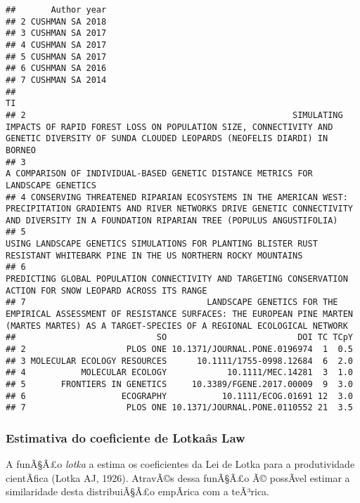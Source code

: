 \documentclass[]{article}
\begin{document}
\begin{verbatim}
##       Author year
## 2 CUSHMAN SA 2018
## 3 CUSHMAN SA 2017
## 4 CUSHMAN SA 2017
## 5 CUSHMAN SA 2017
## 6 CUSHMAN SA 2016
## 7 CUSHMAN SA 2014
##                                                                                                                                                                                                         TI
## 2                                                     SIMULATING IMPACTS OF RAPID FOREST LOSS ON POPULATION SIZE, CONNECTIVITY AND GENETIC DIVERSITY OF SUNDA CLOUDED LEOPARDS (NEOFELIS DIARDI) IN BORNEO
## 3                                                                                                                         A COMPARISON OF INDIVIDUAL-BASED GENETIC DISTANCE METRICS FOR LANDSCAPE GENETICS
## 4 CONSERVING THREATENED RIPARIAN ECOSYSTEMS IN THE AMERICAN WEST: PRECIPITATION GRADIENTS AND RIVER NETWORKS DRIVE GENETIC CONNECTIVITY AND DIVERSITY IN A FOUNDATION RIPARIAN TREE (POPULUS ANGUSTIFOLIA)
## 5                                                                               USING LANDSCAPE GENETICS SIMULATIONS FOR PLANTING BLISTER RUST RESISTANT WHITEBARK PINE IN THE US NORTHERN ROCKY MOUNTAINS
## 6                                                                                            PREDICTING GLOBAL POPULATION CONNECTIVITY AND TARGETING CONSERVATION ACTION FOR SNOW LEOPARD ACROSS ITS RANGE
## 7                                    LANDSCAPE GENETICS FOR THE EMPIRICAL ASSESSMENT OF RESISTANCE SURFACES: THE EUROPEAN PINE MARTEN (MARTES MARTES) AS A TARGET-SPECIES OF A REGIONAL ECOLOGICAL NETWORK
##                            SO                          DOI TC TCpY
## 2                    PLOS ONE 10.1371/JOURNAL.PONE.0196974  1  0.5
## 3 MOLECULAR ECOLOGY RESOURCES      10.1111/1755-0998.12684  6  2.0
## 4           MOLECULAR ECOLOGY            10.1111/MEC.14281  3  1.0
## 5       FRONTIERS IN GENETICS     10.3389/FGENE.2017.00009  9  3.0
## 6                   ECOGRAPHY           10.1111/ECOG.01691 12  3.0
## 7                    PLOS ONE 10.1371/JOURNAL.PONE.0110552 21  3.5
\end{verbatim}

\subsubsection{Estimativa do coeficiente de Lotkaâs
Law}\label{estimativa-do-coeficiente-de-lotkaas-law}

A funÃ§Ã£o \emph{lotka} a estima os coeficientes da Lei de Lotka para a
produtividade cientÃ­fica (Lotka AJ, 1926). AtravÃ©s dessa funÃ§Ã£o Ã©
possÃ­vel estimar a similaridade desta distribuiÃ§Ã£o empÃ­rica com a
teÃ³rica.
\end{document}
